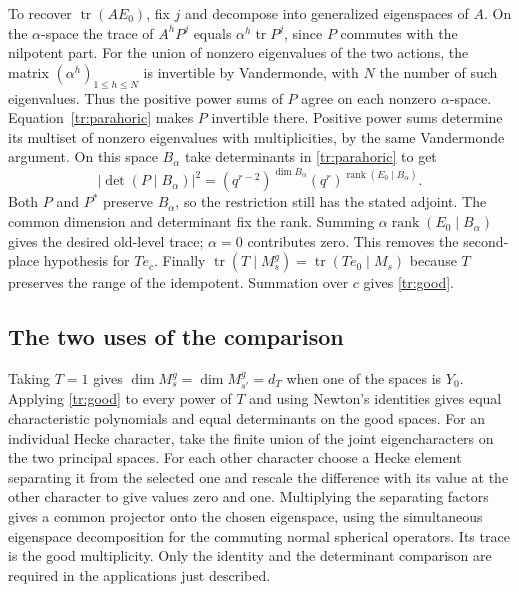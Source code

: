 To recover $\operatorname{tr}(AE_0)$, fix $j$ and decompose into generalized
eigenspaces of $A$. On the $\alpha$-space the trace of $A^hP^j$ equals
$\alpha^h\operatorname{tr} P^j$, since $P$ commutes with the nilpotent
part. For the union of nonzero eigenvalues of the two actions, the
matrix $(\alpha^h)_{1\le h\le N}$ is invertible by Vandermonde, with
$N$ the number of such eigenvalues. Thus the positive power sums of $P$
agree on each nonzero $\alpha$-space. Equation~\eqref{tr:parahoric}
makes $P$ invertible there. Positive power sums determine its multiset
of nonzero eigenvalues with multiplicities, by the same Vandermonde
argument. On this space $B_\alpha$ take determinants in
\eqref{tr:parahoric} to get
\[
  |\det(P\mid B_\alpha)|^2
  =(q^{r-2})^{\dim B_\alpha}(q^r)^{\operatorname{rank}(E_0\mid B_\alpha)} .
\]
Both $P$ and $P^*$ preserve $B_\alpha$, so the restriction still has
the stated adjoint. The common dimension and determinant fix the rank.
Summing $\alpha\operatorname{rank}(E_0\mid B_\alpha)$ gives the desired
old-level trace; $\alpha=0$ contributes zero. This removes the
second-place hypothesis for $T e_c$. Finally
$\operatorname{tr}(T\mid M_s^g)=\operatorname{tr}(Te_0\mid M_s)$
because $T$ preserves the range of the idempotent. Summation over $c$
gives \eqref{tr:good}.

\subsection{The two uses of the comparison}\label{tr:uses}
Taking $T=1$ gives $\dim M_s^g=\dim M_{s'}^g=d_T$ when one of the
spaces is $Y_0$. Applying \eqref{tr:good} to every power of $T$
and using Newton's identities gives equal characteristic polynomials
and equal determinants on the good spaces. For an individual Hecke
character, take the finite union of the joint eigencharacters on the
two principal spaces. For each other character choose a Hecke element
separating it from the selected one and rescale the difference with
its value at the other character to give values zero and one.
Multiplying the separating factors gives a common projector onto the
chosen eigenspace, using the simultaneous eigenspace decomposition
for the commuting normal spherical operators. Its trace is the good
multiplicity. Only the identity and the determinant comparison are
required in the applications just described.

